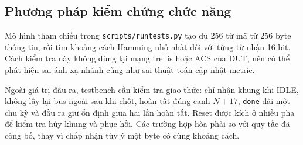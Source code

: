 \documentclass[12pt,a4paper]{article}
\DeclareRobustCommand{\code}[1]{\texttt{#1}}
\renewcommand{\_}{\originalunderscore\allowbreak}
\begin{document}
\subsection{Phương pháp kiểm chứng chức năng}
Mô hình tham chiếu trong \code{scripts/run\_tests.py} tạo đủ 256 từ mã từ 256 byte thông tin, rồi tìm khoảng cách Hamming nhỏ nhất đối với từng từ nhận 16 bit. Cách kiểm tra này không dùng lại mạng trellis hoặc ACS của DUT, nên có thể phát hiện sai ánh xạ nhánh cũng như sai thuật toán cập nhật metric.

Ngoài giá trị đầu ra, testbench cần kiểm tra giao thức: chỉ nhận khung khi IDLE, không lấy lại bus ngoài sau khi chốt, hoàn tất đúng cạnh $N+17$, \code{done} dài một chu kỳ và đầu ra giữ ổn định giữa hai lần hoàn tất. Reset được kích ở nhiều pha để kiểm tra hủy khung và phục hồi. Các trường hợp hòa phải so với quy tắc đã công bố, thay vì chấp nhận tùy ý một byte có cùng khoảng cách.
\end{document}

